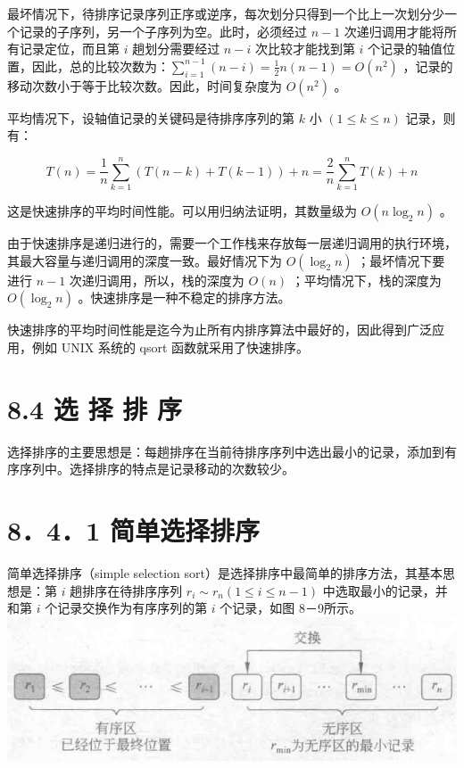 \documentclass[10pt]{article}
\begin{document}
最坏情况下，待排序记录序列正序或逆序，每次划分只得到一个比上一次划分少一个记录的子序列，另一个子序列为空。此时，必须经过 $n-1$ 次递归调用才能将所有记录定位，而且第 $i$ 趟划分需要经过 $n-i$ 次比较才能找到第 $i$ 个记录的轴值位置，因此，总的比较次数为：$\sum_{i=1}^{n-1}(n-i)=\frac{1}{2} n(n-1)=O\left(n^{2}\right)$ ，记录的移动次数小于等于比较次数。因此，时间复杂度为 $O\left(n^{2}\right)$ 。

平均情况下，设轴值记录的关键码是待排序序列的第 $k$ 小 $(1 \leqslant k \leqslant n)$ 记录，则有：

$$
T(n)=\frac{1}{n} \sum_{k=1}^{n}(T(n-k)+T(k-1))+n=\frac{2}{n} \sum_{k=1}^{n} T(k)+n
$$

这是快速排序的平均时间性能。可以用归纳法证明，其数量级为 $O\left(n \log _{2} n\right)$ 。

由于快速排序是递归进行的，需要一个工作栈来存放每一层递归调用的执行环境，其最大容量与递归调用的深度一致。最好情况下为 $O\left(\log _{2} n\right)$ ；最坏情况下要进行 $n-1$ 次递归调用，所以，栈的深度为 $O(n)$ ；平均情况下，栈的深度为 $O\left(\log _{2} n\right)$ 。快速排序是一种不稳定的排序方法。

快速排序的平均时间性能是迄今为止所有内排序算法中最好的，因此得到广泛应用，例如 UNIX 系统的 qsort 函数就采用了快速排序。

\section*{8.4 选 择 排 序}
选择排序的主要思想是：每趟排序在当前待排序序列中选出最小的记录，添加到有序序列中。选择排序的特点是记录移动的次数较少。

\section*{8．4．1 简单选择排序}
简单选择排序（simple selection sort）是选择排序中最简单的排序方法，其基本思想是：第 $i$ 趟排序在待排序序列 $r_{i} \sim r_{n}(1 \leqslant i \leqslant n-1)$ 中选取最小的记录，并和第 $i$ 个记录交换作为有序序列的第 $i$ 个记录，如图 8－9所示。\\
\includegraphics[max width=\textwidth, center]{2025_06_06_704745ea57b15b2333e5g-280}
\end{document}
